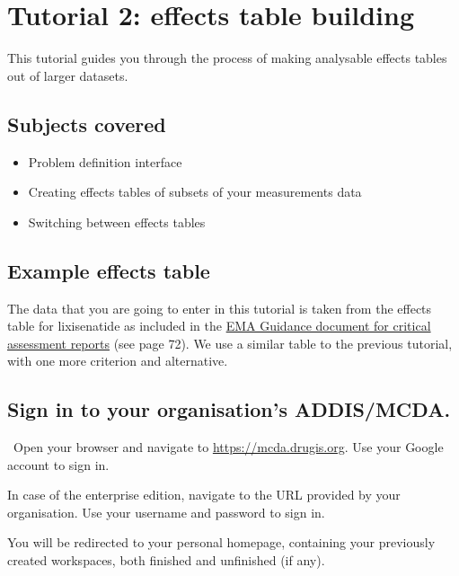 \documentclass[00_mcda_tutorial.tex]{subfiles}
\begin{document}
\section*{Tutorial 2: effects table building}
\addtocounter{section}{1}

This tutorial guides you through the process of making analysable effects tables out of larger datasets.

\subsection*{Subjects covered}
\begin{itemize}
    \item Problem definition interface
    \item Creating effects tables of subsets of your measurements data
    \item Switching between effects tables
\end{itemize}

\subsection*{Example effects table}
The data that you are going to enter in this tutorial is taken from the effects table for lixisenatide as included in the \href{https://www.ema.europa.eu/documents/template-form/day-80-assessment-report-overview-d120-loq-template-guidance-rev-1019_en.docx}{EMA Guidance document for critical assessment reports} (see page 72). We use a similar table to the previous tutorial, with one more criterion and alternative.


\subsection*{Sign in to your organisation's ADDIS/MCDA.}
\leftpointright \, Open your browser and navigate to \href{https://mcda.drugis.org}{https://mcda.drugis.org}.
Use your Google account to sign in.

\begin{sidebar*}
In case of the enterprise edition, navigate to the URL provided by your organisation. Use your username and password to sign in.
\end{sidebar*}

You will be redirected to your personal homepage, containing your previously created workspaces, both finished and unfinished (if any).
\end{document}
